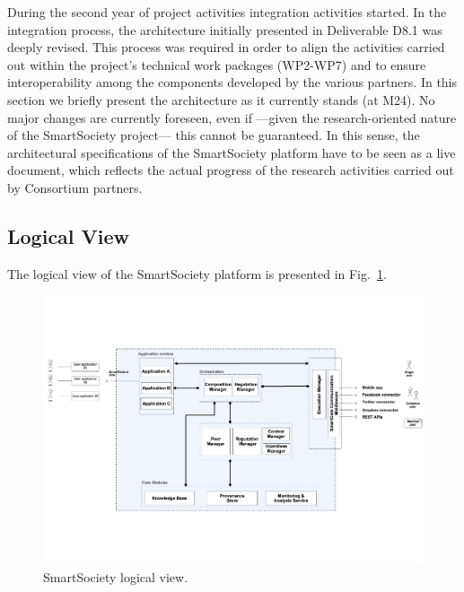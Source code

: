 During the second year of project activities integration activities
started. In the integration process, the architecture initially
presented in Deliverable D8.1 was deeply revised. This process was
required in order to align the activities carried out within the
project's technical work packages (WP2-WP7) and to ensure
interoperability among the components developed by the various
partners. In this section we briefly present the architecture as it
currently stands (at M24). No major changes are currently foreseen,
even if ---given the research-oriented nature of the SmartSociety
project--- this cannot be guaranteed. In this sense, the architectural
specifications of the SmartSociety platform have to be seen as a live document, which reflects the
actual progress of the research activities carried out by Consortium
partners. 

\subsection{Logical View}
The logical view of the SmartSociety platform is presented in Fig.~\ref{fig:logical_view}. %

\begin{figure}[!hbt]
 \centering
 \includegraphics[width=1.1\textwidth]{figs/logical_view.pdf}
 \caption{SmartSociety logical view.}
 \label{fig:logical_view}
\end{figure}

